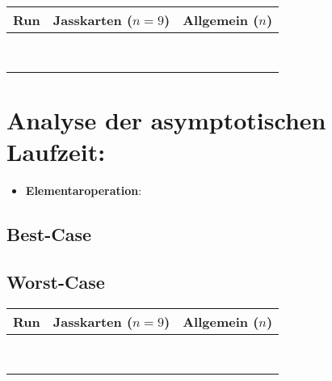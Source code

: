 \begin{table}[htb]
\renewcommand{\arraystretch}{1.5}
\begin{tabular}{|c|p{2cm}|p{3cm}|}
\hline
Run & Jasskarten ($n=9$) & Allgemein ($n$) \\ \hline
    &            &           \\ \hline
    &            &           \\ \hline
    &            &           \\ \hline
    &            &           \\ \hline
    &            &           \\ \hline
    &            &           \\ \hline
    &            &           \\ \hline
    &            &           \\ \hline
\end{tabular}
\end{table}

\newpage

\section{Analyse der asymptotischen Laufzeit:}

\begin{itemize}
\item \textbf{Elementaroperation}:
\end{itemize}

\subsection{Best-Case}

\vspace{5cm}

\subsection{Worst-Case}

\vspace{1.25cm}

\begin{table}[htb]
\renewcommand{\arraystretch}{1.5}
\begin{tabular}{|c|p{2cm}|p{3cm}|}
\hline
Run & Jasskarten ($n=9$) & Allgemein ($n$) \\ \hline
    &            &           \\ \hline
    &            &           \\ \hline
    &            &           \\ \hline
    &            &           \\ \hline
    &            &           \\ \hline
    &            &           \\ \hline
    &            &           \\ \hline
    &            &           \\ \hline
\end{tabular}
\end{table}

